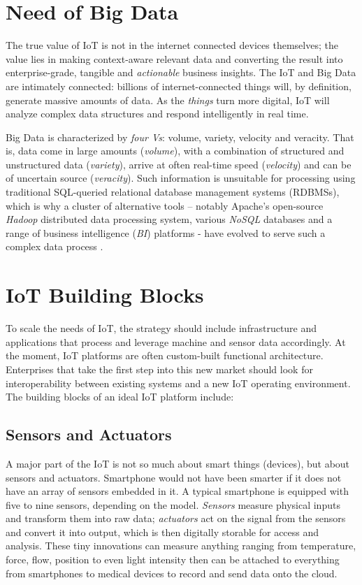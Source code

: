 \documentclass[sigconf]{acmart}
\begin{document}
	\section{Need of Big Data}
	
	The true value of IoT is not in the internet connected devices themselves; the value lies in making context-aware relevant data and converting the result into enterprise-grade, tangible and {\em actionable} business insights. The IoT and Big Data are intimately connected: billions of internet-connected things will, by definition, generate massive amounts of data. As the {\em things} turn more digital, IoT will analyze complex data structures and respond intelligently in real time. 
	
	Big Data is characterized by {\em four Vs}: volume, variety, velocity and veracity. That is, data come in large amounts ({\em volume}), with a combination of structured and unstructured data ({\em variety}), arrive at often real-time speed ({\em velocity}) and can be of uncertain source ({\em veracity}). Such information is unsuitable for processing using traditional SQL-queried relational database management systems (RDBMSs), which is why a cluster of alternative tools -- notably Apache's open-source {\em Hadoop} distributed data processing system, various {\em NoSQL} databases and a range of business intelligence ({\em BI}) platforms - have evolved to serve such a complex data process \cite{big-data}.
	
	
	\section{IoT Building Blocks}
	
	To scale the needs of IoT, the strategy should include infrastructure and applications that process and leverage machine and sensor data accordingly. At the moment, IoT platforms are often custom-built functional architecture. Enterprises that take the first step into this new market should look for interoperability between existing systems and a new IoT operating environment. The building blocks of an ideal IoT platform include:
	
	\subsection{Sensors and Actuators}
	A major part of the IoT is not so much about smart things (devices), but about sensors and actuators. Smartphone would not have been smarter if it does not have an array of sensors embedded in it. A typical smartphone is equipped with five to nine sensors, depending on the model. {\em Sensors} measure physical inputs and transform them into raw data; {\em actuators} act on the signal from the sensors and convert it into output, which is then digitally storable for access and analysis.  These tiny innovations can measure anything ranging from temperature, force, flow, position to even light intensity then can be attached to everything from smartphones to medical devices to record and send data onto the cloud\cite{wiley-book}. 
	
\end{document}
